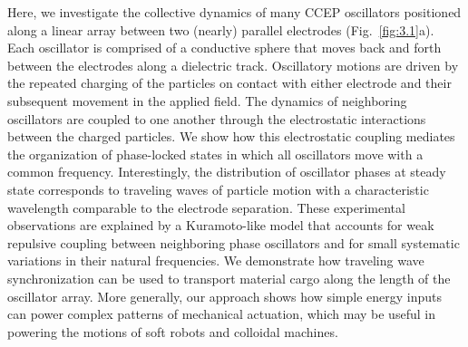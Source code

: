 Here, we investigate the collective dynamics of many CCEP oscillators positioned along a linear array between two (nearly) parallel electrodes (Fig.~\ref{fig:3.1}a). Each oscillator is comprised of a conductive sphere that moves back and forth between the electrodes along a dielectric track.  Oscillatory motions are driven by the repeated charging of the particles on contact with either electrode and their subsequent movement in the applied field. The dynamics of neighboring oscillators are coupled to one another through the electrostatic interactions between the charged particles. We show how this electrostatic coupling mediates the organization of phase-locked states in which all oscillators move with a common frequency. Interestingly, the distribution of oscillator phases at steady state corresponds to traveling waves of particle motion with a characteristic wavelength comparable to the electrode separation. These experimental observations are explained by a Kuramoto-like model\autocite{Acebron2005,Tsimring2005} that accounts for weak repulsive coupling between neighboring phase oscillators and for small systematic variations in their natural frequencies. We demonstrate how traveling wave synchronization can be used to transport material cargo along the length of the oscillator array. More generally, our approach shows how simple energy inputs can power complex patterns of mechanical actuation, which may be useful in powering the motions of soft robots\autocite{rus2015design, acome2018hydraulically} and colloidal machines\autocite{Snezhko2011,Yan2012, Martinez-Pedrero2015, goodrich2017using, Driscoll2017}.

